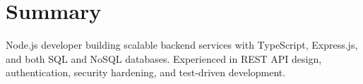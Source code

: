 \section{Summary}
Node.js developer building scalable backend services with TypeScript, Express.js, and both SQL and NoSQL databases. Experienced in REST API design, authentication, security hardening, and test-driven development.
